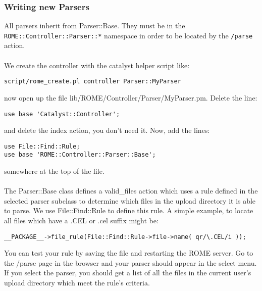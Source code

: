 \subsubsection{Writing new Parsers}
All parsers inherit from Parser::Base. They must be in the \texttt{ROME::Controller::Parser::*} namespace in order to be located by the \verb|/parse| action. 
 
\paragraph*{}
We create the controller with the catalyst helper script like:

\begin{verbatim}
script/rome_create.pl controller Parser::MyParser
\end{verbatim}

now open up the file lib/ROME/Controller/Parser/MyParser.pm. Delete the line:

\begin{verbatim}
use base 'Catalyst::Controller';
\end{verbatim}

and delete the index action, you don't need it. Now, add the lines:

\begin{verbatim}
use File::Find::Rule;
use base 'ROME::Controller::Parser::Base';

\end{verbatim}

somewhere at the top of the file.
 
\paragraph*{}
The Parser::Base class defines a valid\_files action which uses a rule defined in the selected parser subclass to determine which files in the upload directory it is able to parse. We use File::Find::Rule to define this rule. A simple example, to locate all files which have a .CEL or .cel suffix might be: 
 
\begin{verbatim}
__PACKAGE__->file_rule(File::Find::Rule->file->name( qr/\.CEL/i ));
\end{verbatim}

You can test your rule by saving the file and restarting the ROME server. Go to the /parse page in the browser and your parser should appear in the select menu. If you select the parser, you should get a list of all the files in the current user's upload directory which meet the rule's criteria.



